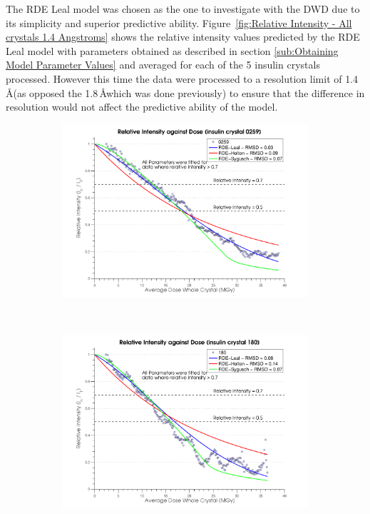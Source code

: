 The RDE Leal model was chosen as the one to investigate with the DWD due to its simplicity and superior predictive ability.
Figure~\ref{fig:Relative Intensity - All crystals 1.4 Angstroms} shows the relative intensity values predicted by the RDE Leal model with parameters obtained as described in section \ref{sub:Obtaining Model Parameter Values} and averaged for each of the 5 insulin crystals processed.
However this time the data were processed to a resolution limit of 1.4\,\AA (as opposed the 1.8$\,$\AA which was done previously) to ensure that the difference in resolution would not affect the predictive ability of the model.
\begin{figure}[H]
    \centering
    \begin{subfigure}[b]{1\textwidth}
        \centering
        \includegraphics[width=\textwidth]{figures/dwd/relintplot0259.pdf}
        \caption{}
        \label{Relative Intensity Plots - 0259}
    \end{subfigure}
			\\
    \begin{subfigure}[b]{1\textwidth}
        \centering
        \includegraphics[width=\textwidth]{figures/dwd/relintplot180.pdf}
        \caption{}
        \label{Relative Intensity Plots - 180}
    \end{subfigure}
\end{figure}
